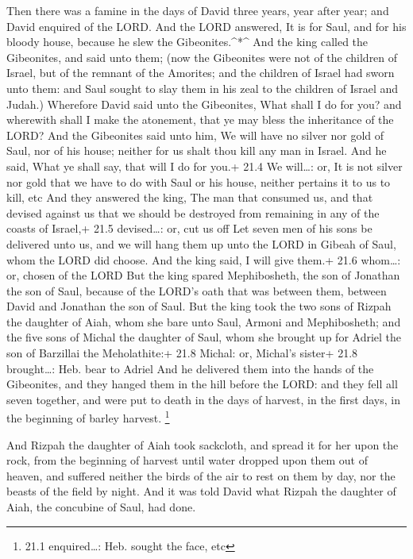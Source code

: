  Then there was a famine in the days of David three years,
year after year; and David enquired of the LORD. And the LORD answered,
It is for Saul, and for his bloody house, because he slew the
Gibeonites.\^{}*\^{}  And the king called the Gibeonites,
and said unto them; (now the Gibeonites were not of the children of
Israel, but of the remnant of the Amorites; and the children of Israel
had sworn unto them: and Saul sought to slay them in his zeal to the
children of Israel and Judah.)  Wherefore David said unto
the Gibeonites, What shall I do for you? and wherewith shall I make the
atonement, that ye may bless the inheritance of the LORD? 
And the Gibeonites said unto him, We will have no silver nor gold of
Saul, nor of his house; neither for us shalt thou kill any man in
Israel. And he said, What ye shall say, that will I do for you.+ 21.4 We
will\ldots: or, It is not silver nor gold that we have to do with Saul
or his house, neither pertains it to us to kill, etc  And
they answered the king, The man that consumed us, and that devised
against us that we should be destroyed from remaining in any of the
coasts of Israel,+ 21.5 devised\ldots: or, cut us off  Let
seven men of his sons be delivered unto us, and we will hang them up
unto the LORD in Gibeah of Saul, whom the LORD did choose. And the king
said, I will give them.+ 21.6 whom\ldots: or, chosen of the LORD
 But the king spared Mephibosheth, the son of Jonathan the
son of Saul, because of the LORD's oath that was between them, between
David and Jonathan the son of Saul.  But the king took the
two sons of Rizpah the daughter of Aiah, whom she bare unto Saul, Armoni
and Mephibosheth; and the five sons of Michal the daughter of Saul, whom
she brought up for Adriel the son of Barzillai the Meholathite:+ 21.8
Michal: or, Michal's sister+ 21.8 brought\ldots: Heb. bear to Adriel
 And he delivered them into the hands of the Gibeonites, and
they hanged them in the hill before the LORD: and they fell all seven
together, and were put to death in the days of harvest, in the first
days, in the beginning of barley harvest. \footnote{21.1 enquired\ldots:
  Heb. sought the face, etc}

 And Rizpah the daughter of Aiah took sackcloth, and spread
it for her upon the rock, from the beginning of harvest until water
dropped upon them out of heaven, and suffered neither the birds of the
air to rest on them by day, nor the beasts of the field by night.
 And it was told David what Rizpah the daughter of Aiah,
the concubine of Saul, had done.

